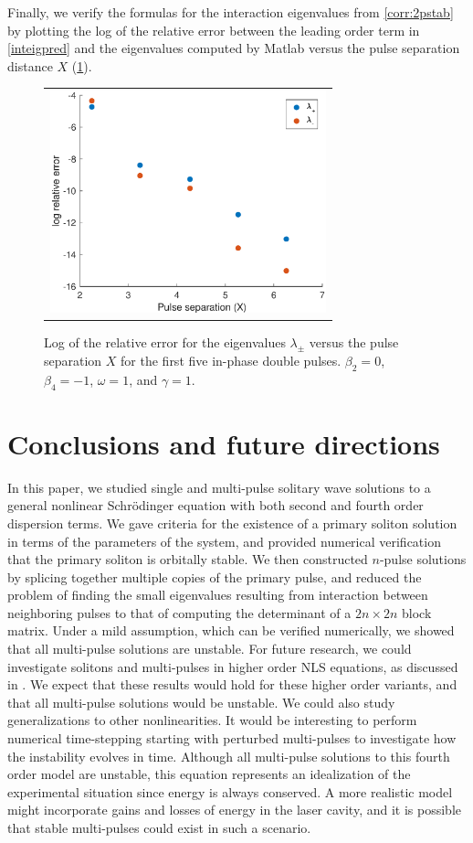\documentclass[12pt]{elsarticle}
\begin{document}
Finally, we verify the formulas for the interaction eigenvalues from \cref{corr:2pstab} by plotting the log of the relative error between the leading order term in \cref{inteigpred} and the eigenvalues computed by Matlab versus the pulse separation distance $X$ (\cref{fig:inteigpred}). 

\begin{figure}[H]
\centering
\begin{tabular}{c}
\includegraphics[width=8cm]{images/inteigpred.eps}
\end{tabular}
\caption{Log of the relative error for the eigenvalues $\lambda_\pm$ versus the pulse separation $X$ for the first five in-phase double pulses. $\beta_2 = 0$, $\beta_4 = -1$, $\omega = 1$, and $\gamma = 1$.}
\label{fig:inteigpred}
\end{figure}

\section{Conclusions and future directions}

In this paper, we studied single and multi-pulse solitary wave solutions to a general nonlinear Schr{\"o}dinger equation with both second and fourth order dispersion terms. We gave criteria for the existence of a primary soliton solution in terms of the parameters of the system, and provided numerical verification that the primary soliton is orbitally stable. We then constructed $n$-pulse solutions by splicing together multiple copies of the primary pulse, and reduced the problem of finding the small eigenvalues resulting from interaction between neighboring pulses to that of computing the determinant of a $2n\times2n$ block matrix. Under a mild assumption, which can be verified numerically, we showed that all multi-pulse solutions are unstable. For future research, we could investigate solitons and multi-pulses in higher order NLS equations, as discussed in \cite{Runge2020}. We expect that these results would hold for these higher order variants, and that all multi-pulse solutions would be unstable. We could also study generalizations to other nonlinearities. It would be interesting to perform numerical time-stepping starting with perturbed multi-pulses to investigate how the instability evolves in time. Although all multi-pulse solutions to this fourth order model are unstable, this equation represents an idealization of the experimental situation since energy is always conserved. A more realistic model might incorporate gains and losses of energy in the laser cavity, and it is possible that stable multi-pulses could exist in such a scenario.
\end{document}
